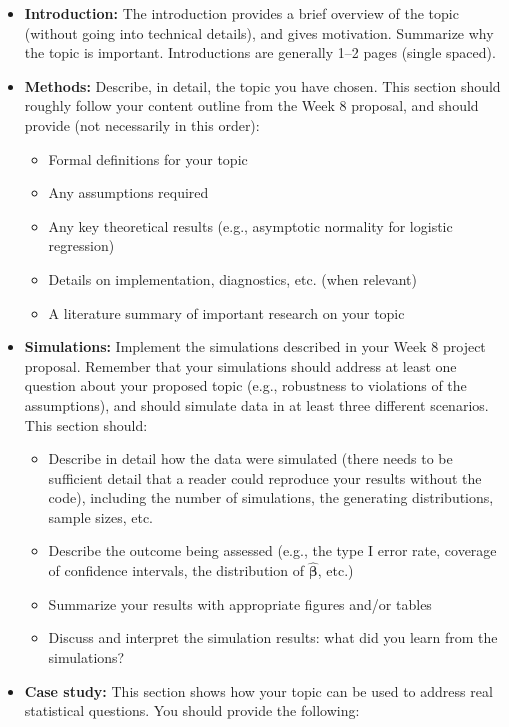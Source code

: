 \documentclass[11pt]{article}
\begin{document}
\begin{itemize}
\item \textbf{Introduction:} The introduction provides a brief overview of the topic (without going into technical details), and gives motivation. Summarize why the topic is important. Introductions are generally 1--2 pages (single spaced).

\item \textbf{Methods:} Describe, in detail, the topic you have chosen. This section should roughly follow your content outline from the Week 8 proposal, and should provide (not necessarily in this order):
\begin{itemize}
\item Formal definitions for your topic
\item Any assumptions required
\item Any key theoretical results (e.g., asymptotic normality for logistic regression)
\item Details on implementation, diagnostics, etc. (when relevant)
\item A literature summary of important research on your topic
\end{itemize}

\item \textbf{Simulations:} Implement the simulations described in your Week 8 project proposal. Remember that your simulations should address at least one question about your proposed topic (e.g., robustness to violations of the assumptions), and should simulate data in at least three different scenarios. This section should:
\begin{itemize}
\item Describe in detail how the data were simulated (there needs to be sufficient detail that a reader could reproduce your results without the code), including the number of simulations, the generating distributions, sample sizes, etc.
\item Describe the outcome being assessed (e.g., the type I error rate, coverage of confidence intervals, the distribution of $\widehat{\bm{\beta}}$, etc.)
\item Summarize your results with appropriate figures and/or tables
\item Discuss and interpret the simulation results: what did you learn from the simulations?
\end{itemize}

\item \textbf{Case study:} This section shows how your topic can be used to address real statistical questions. You should provide the following:


\end{itemize}
\end{document}
